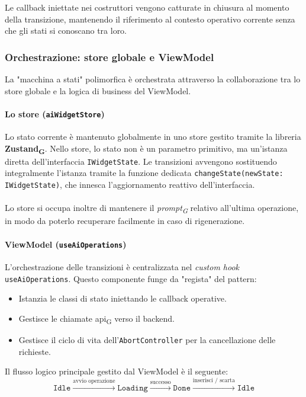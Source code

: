 \documentclass[11pt,a4paper]{article}
\newcommand{\gls}[1]{#1\textsubscript{G}}
\begin{document}
Le callback iniettate nei costruttori vengono catturate in chiusura al momento della transizione, mantenendo il riferimento al contesto operativo corrente senza che gli stati si conoscano tra loro.


\subsubsection{Orchestrazione: store globale e ViewModel}
La "macchina a stati" polimorfica è orchestrata attraverso la collaborazione tra lo store globale e la logica di business del ViewModel.

\paragraph{Lo store (\texttt{aiWidgetStore})}
Lo stato corrente è mantenuto globalmente in uno store gestito tramite la libreria \textbf{\gls{Zustand}}. Nello store, lo stato non è un parametro primitivo, ma un'istanza diretta dell'interfaccia \texttt{IWidgetState}. Le transizioni avvengono sostituendo integralmente l'istanza tramite la funzione dedicata \texttt{changeState(newState: IWidgetState)}, che innesca l'aggiornamento reattivo dell'interfaccia.\\\\
Lo store si occupa inoltre di mantenere il \textit{\gls{prompt}} relativo all’ultima operazione, in modo da poterlo recuperare facilmente in caso di rigenerazione.

\paragraph{ViewModel (\texttt{useAiOperations})}
L'orchestrazione delle transizioni è centralizzata nel \textit{custom hook} \texttt{useAiOperations}. Questo componente funge da "regista" del pattern:
\begin{itemize}
    \item Istanzia le classi di stato iniettando le callback operative.
    \item Gestisce le chiamate \gls{api} verso il backend.
    \item Gestisce il ciclo di vita dell'\texttt{AbortController} per la cancellazione delle richieste.
\end{itemize}

Il flusso logico principale gestito dal ViewModel è il seguente:
\begin{equation*}
\texttt{Idle} \xrightarrow{\text{avvio operazione}} \texttt{Loading} \xrightarrow{\text{successo}} \texttt{Done} \xrightarrow{\text{inserisci / scarta}} \texttt{Idle}
\end{equation*}
\end{document}
